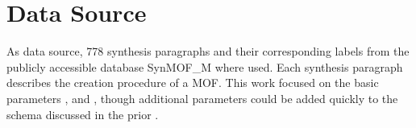







\section{Data Source}\label{sec:data}
As data source, 778 synthesis paragraphs and their corresponding labels from the publicly accessible database SynMOF\_M \cite{luo_mof_2022} where used.
Each synthesis paragraph describes the creation procedure of a \gls{MOF}.
This work focused on the basic parameters \ttemp, \ttime and \tsolv, though additional parameters could be added quickly to the schema discussed in the prior .

